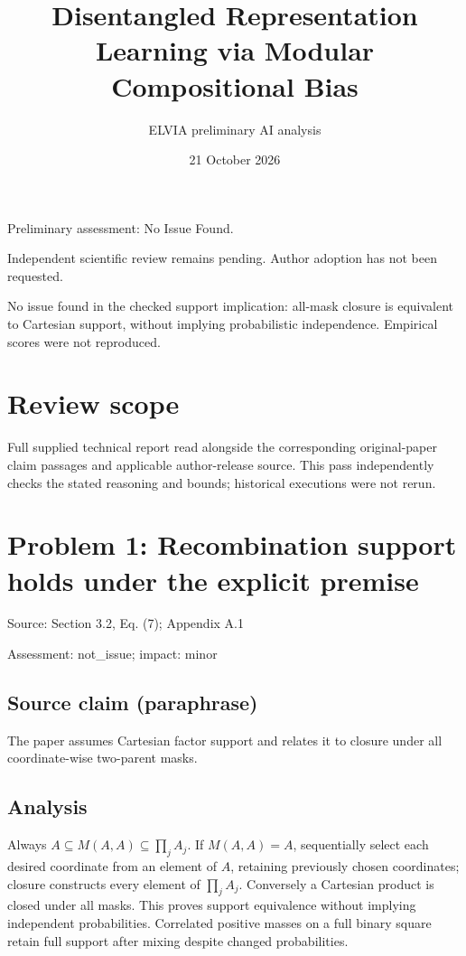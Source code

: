 \documentclass[11pt]{article}
\begin{document}
\title{Disentangled Representation Learning via Modular Compositional Bias}

\author{ELVIA preliminary AI analysis}\date{21 October 2026}\maketitle

Preliminary assessment: No Issue Found.\par

Independent scientific review remains pending. Author adoption has not been requested.

No issue found in the checked support implication: all-mask closure is equivalent to Cartesian support, without implying probabilistic independence. Empirical scores were not reproduced.

\section*{Review scope}

Full supplied technical report read alongside the corresponding original-paper claim passages and applicable author-release source. This pass independently checks the stated reasoning and bounds; historical executions were not rerun.

\section*{Problem 1: Recombination support holds under the explicit premise}

Source: Section 3.2, Eq. (7); Appendix A.1

Assessment: not\_issue; impact: minor

\subsection*{Source claim (paraphrase)}

The paper assumes Cartesian factor support and relates it to closure under all coordinate-wise two-parent masks.

\subsection*{Analysis}

Always \(A\subseteq M(A,A)\subseteq\prod_j A_j\). If \(M(A,A)=A\), sequentially select each desired coordinate from an element of \(A\), retaining previously chosen coordinates; closure constructs every element of \(\prod_jA_j\). Conversely a Cartesian product is closed under all masks. This proves support equivalence without implying independent probabilities. Correlated positive masses on a full binary square retain full support after mixing despite changed probabilities.
\end{document}
